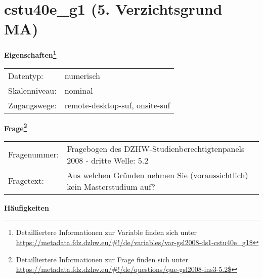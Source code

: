 
    \setcounter{footnote}{0}

    \vspace*{-1.8cm}
	\section{cstu40e\_g1 (5. Verzichtsgrund MA)}
	\label{section:cstu40e_g1}



    \vspace*{0.5cm}
    \noindent\textbf{Eigenschaften\footnote{Detailliertere Informationen zur Variable finden sich unter
		\url{https://metadata.fdz.dzhw.eu/\#!/de/variables/var-gsl2008-ds1-cstu40e_g1$}}}\\
	\begin{tabularx}{\hsize}{@{}lX}
	Datentyp: & numerisch \\
	Skalenniveau: & nominal \\
	Zugangswege: &
	  remote-desktop-suf, 
	  onsite-suf
 \\
    \end{tabularx}



				\vspace*{0.5cm}
                \noindent\textbf{Frage\footnote{Detailliertere Informationen zur Frage finden sich unter
		              \url{https://metadata.fdz.dzhw.eu/\#!/de/questions/que-gsl2008-ins3-5.2$}}}\\
				\begin{tabularx}{\hsize}{@{}lX}
					Fragenummer: &
					  Fragebogen des DZHW-Studienberechtigtenpanels 2008 - dritte Welle:
					  5.2
 \\
					Fragetext: & Aus welchen Gründen nehmen Sie (voraussichtlich) kein Masterstudium auf? \\
				\end{tabularx}





        		\vspace*{0.5cm}
                \noindent\textbf{Häufigkeiten}

